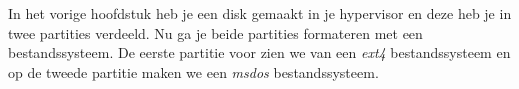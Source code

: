 In het vorige hoofdstuk heb je een disk gemaakt in je hypervisor en deze heb je in twee partities verdeeld. Nu ga je beide partities formateren met een bestandssysteem. De eerste partitie voor zien we van een \textit{ext4} bestandssysteem en op de tweede partitie maken we een \textit{msdos} bestandssysteem.

